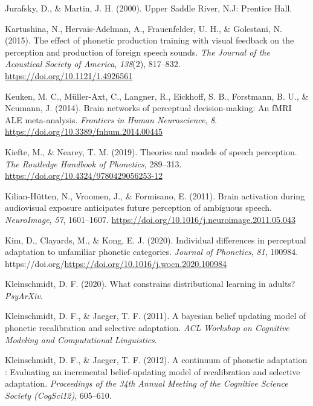 \documentclass[
  11pt,
  english,
  man,floatsintext]{apa6}
\newlength{\cslhangindent}
\newlength{\cslentryspacingunit} %
\newenvironment{CSLReferences}[2] %
 {%
  \setlength{\parindent}{0pt}
  \ifodd #1
  \let\oldpar\par
  \def\par{\hangindent=\cslhangindent\oldpar}
  \fi
  \setlength{\parskip}{#2\cslentryspacingunit}
 }%
 {}
\begin{document}
\begin{CSLReferences}{1}{0}
\leavevmode{}%
Jurafsky, D., \& Martin, J. H. (2000). Upper Saddle River, N.J: Prentice Hall.

\leavevmode{}%
Kartushina, N., Hervais-Adelman, A., Frauenfelder, U. H., \& Golestani, N. (2015). The effect of phonetic production training with visual feedback on the perception and production of foreign speech sounds. \emph{The Journal of the Acoustical Society of America}, \emph{138}(2), 817--832. \url{https://doi.org/10.1121/1.4926561}

\leavevmode{}%
Keuken, M. C., Müller-Axt, C., Langner, R., Eickhoff, S. B., Forstmann, B. U., \& Neumann, J. (2014). Brain networks of perceptual decision-making: An fMRI ALE meta-analysis. \emph{Frontiers in Human Neuroscience}, \emph{8}. \url{https://doi.org/10.3389/fnhum.2014.00445}

\leavevmode{}%
Kiefte, M., \& Nearey, T. M. (2019). Theories and models of speech perception. \emph{The Routledge Handbook of Phonetics}, 289--313. \url{https://doi.org/10.4324/9780429056253-12}

\leavevmode{}%
Kilian-Hütten, N., Vroomen, J., \& Formisano, E. (2011). Brain activation during audiovisual exposure anticipates future perception of ambiguous speech. \emph{NeuroImage}, \emph{57}, 1601--1607. \url{https://doi.org/10.1016/j.neuroimage.2011.05.043}

\leavevmode{}%
Kim, D., Clayards, M., \& Kong, E. J. (2020). Individual differences in perceptual adaptation to unfamiliar phonetic categories. \emph{Journal of Phonetics}, \emph{81}, 100984. https://doi.org/\url{https://doi.org/10.1016/j.wocn.2020.100984}

\leavevmode{}%
Kleinschmidt, D. F. (2020). What constrains distributional learning in adults? \emph{PsyArXiv}.

\leavevmode{}%
Kleinschmidt, D. F., \& Jaeger, T. F. (2011). A bayesian belief updating model of phonetic recalibration and selective adaptation. \emph{ACL Workshop on Cognitive Modeling and Computational Linguistics}.

\leavevmode{}%
Kleinschmidt, D. F., \& Jaeger, T. F. (2012). A continuum of phonetic adaptation : Evaluating an incremental belief-updating model of recalibration and selective adaptation. \emph{Proceedings of the 34th Annual Meeting of the Cognitive Science Society (CogSci12)}, 605--610.


\end{CSLReferences}
\end{document}

